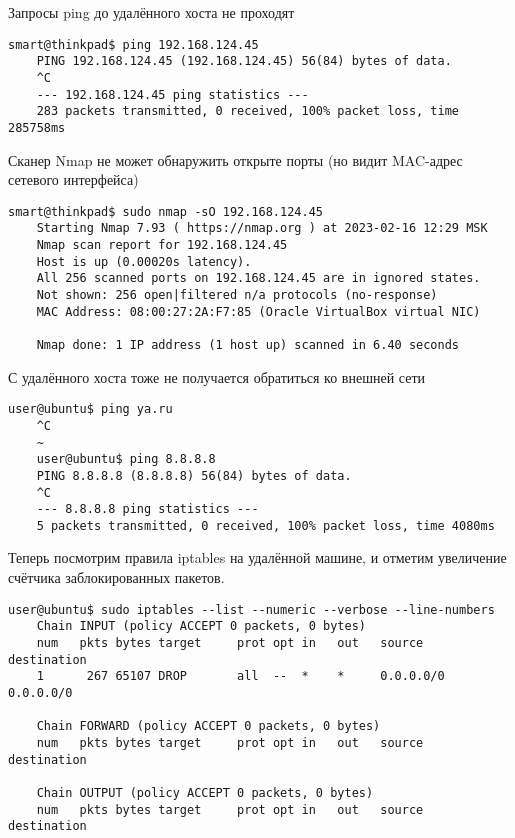 Запросы ping до удалённого хоста не проходят

\begin{Verbatim}[frame=single,breaklines=true,breakanywhere=true]
    smart@thinkpad$ ping 192.168.124.45
    PING 192.168.124.45 (192.168.124.45) 56(84) bytes of data.
    ^C
    --- 192.168.124.45 ping statistics ---
    283 packets transmitted, 0 received, 100% packet loss, time 285758ms
\end{Verbatim}

Сканер Nmap не может обнаружить открыте порты (но видит MAC-адрес сетевого интерфейса)

\begin{Verbatim}[frame=single,breaklines=true,breakanywhere=true]
    smart@thinkpad$ sudo nmap -sO 192.168.124.45
    Starting Nmap 7.93 ( https://nmap.org ) at 2023-02-16 12:29 MSK
    Nmap scan report for 192.168.124.45
    Host is up (0.00020s latency).
    All 256 scanned ports on 192.168.124.45 are in ignored states.
    Not shown: 256 open|filtered n/a protocols (no-response)
    MAC Address: 08:00:27:2A:F7:85 (Oracle VirtualBox virtual NIC)

    Nmap done: 1 IP address (1 host up) scanned in 6.40 seconds
\end{Verbatim}

С удалённого хоста тоже не получается обратиться ко внешней сети
\begin{Verbatim}[frame=single,breaklines=true,breakanywhere=true]
    user@ubuntu$ ping ya.ru
    ^C
    ~
    user@ubuntu$ ping 8.8.8.8
    PING 8.8.8.8 (8.8.8.8) 56(84) bytes of data.
    ^C
    --- 8.8.8.8 ping statistics ---
    5 packets transmitted, 0 received, 100% packet loss, time 4080ms
\end{Verbatim}

Теперь посмотрим правила iptables на удалённой машине, и отметим увеличение счётчика заблокированных пакетов.
\begin{Verbatim}[frame=single,breaklines=true,breakanywhere=true]
    user@ubuntu$ sudo iptables --list --numeric --verbose --line-numbers
    Chain INPUT (policy ACCEPT 0 packets, 0 bytes)
    num   pkts bytes target     prot opt in   out   source      destination
    1      267 65107 DROP       all  --  *    *     0.0.0.0/0   0.0.0.0/0

    Chain FORWARD (policy ACCEPT 0 packets, 0 bytes)
    num   pkts bytes target     prot opt in   out   source      destination

    Chain OUTPUT (policy ACCEPT 0 packets, 0 bytes)
    num   pkts bytes target     prot opt in   out   source      destination
\end{Verbatim}


